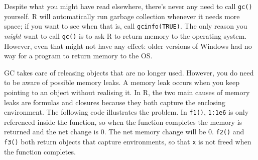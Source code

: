 \begin{Shaded}
\begin{Highlighting}[]
\StringTok{ }\NormalTok{:}\NormalTok{)}
\StringTok{ }
\NormalTok{(}
\NormalTok{(}
\end{Highlighting}
\end{Shaded}

Despite what you might have read elsewhere, there's never any need to
call \texttt{gc()} yourself. R will automatically run garbage collection
whenever it needs more space; if you want to see when that is, call
\texttt{gcinfo(TRUE)}. The only reason you \emph{might} want to call
\texttt{gc()} is to ask R to return memory to the operating system.
However, even that might not have any effect: older versions of Windows
had no way for a program to return memory to the OS. 

GC takes care of releasing objects that are no longer used. However, you
do need to be aware of possible memory leaks. A memory leak occurs when
you keep pointing to an object without realising it. In R, the two main
causes of memory leaks are formulas and closures because they both
capture the enclosing environment. The following code illustrates the
problem. In \texttt{f1()}, \texttt{1:1e6} is only referenced inside the
function, so when the function completes the memory is returned and the
net change is 0. The net memory change will be 0. \texttt{f2()} and
\texttt{f3()} both return objects that capture environments, so that
\texttt{x} is not freed when the function completes.

